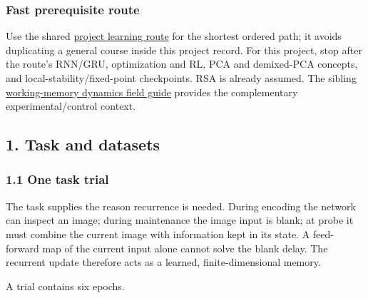 \documentclass[
  10pt,
]{article}
\begin{document}
\hypertarget{fast-prerequisite-route}{%
\subsubsection{Fast prerequisite route}\label{fast-prerequisite-route}}

Use the shared \href{../../learning/current_bci.md}{project learning
route} for the shortest ordered path; it avoids duplicating a general
course inside this project record. For this project, stop after the
route's RNN/GRU, optimization and RL, PCA and demixed-PCA concepts, and
local-stability/fixed-point checkpoints. RSA is already assumed. The
sibling \href{../../wm_dynamics/PROJECT_FIELD_GUIDE.pdf}{working-memory
dynamics field guide} provides the complementary experimental/control
context.

\hypertarget{task-and-datasets}{%
\subsection{1. Task and datasets}\label{task-and-datasets}}

\hypertarget{one-task-trial}{%
\subsubsection{1.1 One task trial}\label{one-task-trial}}

The task supplies the reason recurrence is needed. During encoding the
network can inspect an image; during maintenance the image input is
blank; at probe it must combine the current image with information kept
in its state. A feed-forward map of the current input alone cannot solve
the blank delay. The recurrent update therefore acts as a learned,
finite-dimensional memory.

A trial contains six epochs.
\end{document}
